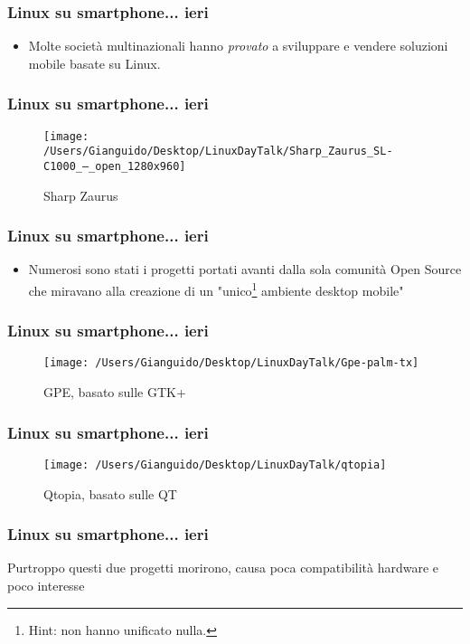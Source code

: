 \documentclass[12pt]{beamer}
\begin{document}
\begin{frame}
\frametitle{Linux su smartphone... ieri}
\begin{itemize}
\item Molte società multinazionali hanno \textit{provato} a sviluppare e vendere soluzioni mobile basate su Linux.
\end{itemize}
\end{frame}

\begin{frame}
\frametitle{Linux su smartphone... ieri}
\begin{figure}
\centering
\texttt{[image: /Users/Gianguido/Desktop/LinuxDayTalk/Sharp\_Zaurus\_SL-C1000\_--\_open\_1280x960]}
\caption[Sharp Zaurus]{Sharp Zaurus}
\label{Sharp Zaurus}
\end{figure}
\end{frame}

\begin{frame}
\frametitle{Linux su smartphone... ieri}
\begin{itemize}
\item Numerosi sono stati i progetti portati avanti dalla sola comunità Open Source che miravano alla creazione di un "unico\footnote{Hint: non hanno unificato nulla.} ambiente desktop mobile"
\end{itemize}
\end{frame}

\begin{frame}
\frametitle{Linux su smartphone... ieri}
\begin{figure}
\centering
\texttt{[image: /Users/Gianguido/Desktop/LinuxDayTalk/Gpe-palm-tx]}
\caption[GPE]{GPE, basato sulle GTK+}
\label{fig:GPE}
\end{figure}
\end{frame}

\begin{frame}
\frametitle{Linux su smartphone... ieri}
\begin{figure}
\centering
\texttt{[image: /Users/Gianguido/Desktop/LinuxDayTalk/qtopia]}
\caption[Qtopia]{Qtopia, basato sulle QT}
\label{fig:qtopia}
\end{figure}
\end{frame}

\begin{frame}
\frametitle{Linux su smartphone... ieri}
Purtroppo questi due progetti morirono, causa poca compatibilità hardware e poco interesse
\end{frame}
\end{document}

